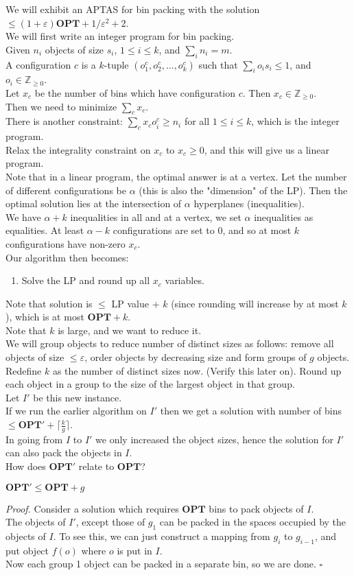 \documentclass[a4paper]{article}
\newenvironment{proof}{\begin{breakbox}\textit{Proof.}}{\hfill$\square$\end{breakbox}}
\newcommand{\nl}{\vspace{0.2cm}\\}
\newcommand{\eps}{\varepsilon}
\newcommand{\Z}{\mathbb{Z}}
\newcommand{\OPT}{\mathbf{OPT}}
\begin{document}
We will exhibit an APTAS for bin packing with the solution $\le (1 + \eps) \OPT + 1/\eps^2 + 2$.\nl
We will first write an integer program for bin packing.\nl
Given $n_i$ objects of size $s_i$, $1 \le i \le k$, and $\sum_i n_i = m$.\nl
A configuration $c$ is a $k$-tuple $(o_1^c, o_2^c, \ldots, o_k^c)$ such that $\sum_i o_i s_i \le 1$, and $o_i \in \Z_{\ge 0}$.\nl
Let $x_c$ be the number of bins which have configuration $c$. Then $x_c \in \Z_{\ge 0}$.\nl
Then we need to minimize $\sum_{c} x_c$.\nl
There is another constraint: $\sum_{c} x_c o_i^c \ge n_i$ for all $1 \le i \le k$, which is the integer program.\nl
Relax the integrality constraint on $x_c$ to $x_c \ge 0$, and this will give us a linear program.\nl
Note that in a linear program, the optimal answer is at a vertex.
Let the number of different configurations be $\alpha$ (this is also the "dimension" of the LP). Then the optimal solution lies at the intersection of $\alpha$ hyperplanes (inequalities).\nl
We have $\alpha + k$ inequalities in all and at a vertex, we set $\alpha$ inequalities as equalities. At least $\alpha - k$ configurations are set to $0$, and so at most $k$ configurations have
non-zero $x_c$.\nl
Our algorithm then becomes:
\begin{enumerate}
    \item Solve the LP and round up all $x_c$ variables.
\end{enumerate}
Note that solution is $\le$ LP value + $k$ (since rounding will increase by at most $k$), which is at most $\OPT + k$.\nl
Note that $k$ is large, and we want to reduce it.\nl
We will group objects to reduce number of distinct sizes as follows: remove all objects of size $\le \eps$, order objects by decreasing size and form groups of $g$ objects.\nl
Redefine $k$ as the number of distinct sizes now. (Verify this later on).
Round up each object in a group to the size of the largest object in that group.\nl
Let $I'$ be this new instance.\nl
If we run the earlier algorithm on $I'$ then we get a solution with number of bins $\le \OPT' + \lceil\frac{k}{g}\rceil$.\nl
In going from $I$ to $I'$ we only increased the object sizes, hence the solution for $I'$ can also pack the objects in $I$.\nl
How does $\OPT'$ relate to $\OPT$?\nl
\begin{claim}
    $\OPT' \le \OPT + g$
\end{claim}
\begin{proof}
    Consider a solution which requires $\OPT$ bins to pack objects of $I$.\nl
    The objects of $I'$, except those of $g_1$ can be packed in the spaces occupied by the objects of $I$. To see this, we can just construct a mapping from $g_i$ to $g_{i-1}$, and put object $f(o)$
    where $o$ is put in $I$.\nl
    Now each group 1 object can be packed in a separate bin, so we are done.
\end{proof}
\end{document}
